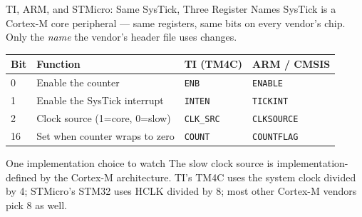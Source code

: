 \documentclass[9pt,aspectratio=169,xcolor=table]{beamer}
\begin{document}
{\beamerextras
\begin{frame}{TI, ARM, and STMicro: Same SysTick, Three Register Names}
    \leavevmode
    {\small SysTick is a Cortex-M core peripheral --- same registers, same
    bits on every vendor's chip. Only the \emph{name} the vendor's header
    file uses changes.}

    \vspace{3mm}
    \begin{center}
    {\footnotesize
    \striped
    \begin{tabular}{@{}l l l l@{}}
        \toprule
        \textbf{Bit} & \textbf{Function} & \textbf{TI (TM4C)} & \textbf{ARM / CMSIS} \\
        \midrule
        0  & Enable the counter               & \texttt{ENB}     & \texttt{ENABLE} \\
        1  & Enable the SysTick interrupt     & \texttt{INTEN}   & \texttt{TICKINT} \\
        2  & Clock source (1=core, 0=slow)    & \texttt{CLK\_SRC}& \texttt{CLKSOURCE} \\
        16 & Set when counter wraps to zero   & \texttt{COUNT}   & \texttt{COUNTFLAG} \\
        \bottomrule
    \end{tabular}}
    \end{center}

    \vspace{3mm}
    \begin{block}{One implementation choice to watch}
        {\small The slow clock source is \alert{implementation-defined} by
        the Cortex-M architecture. TI's TM4C uses the system clock divided
        by \alert{4}; STMicro's STM32 uses HCLK divided by \alert{8}; most
        other Cortex-M vendors pick \alert{8} as well.}
    \end{block}
\end{frame}
}
\end{document}

